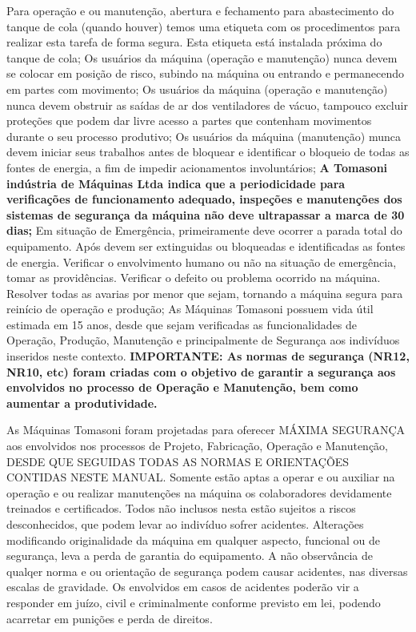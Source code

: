 Para operação e ou manutenção, abertura e fechamento para abastecimento do tanque de cola (quando houver) temos
uma etiqueta com os procedimentos para realizar esta tarefa de forma segura. Esta etiqueta está instalada próxima do
tanque de cola;
Os usuários da máquina (operação e manutenção) nunca devem se colocar em posição de risco, subindo na máquina ou
entrando e permanecendo em partes com movimento;
Os usuários da máquina (operação e manutenção) nunca devem obstruir as saídas de ar dos ventiladores de vácuo,
tampouco excluir proteções que podem dar livre acesso a partes que contenham movimentos durante o seu processo
produtivo;
Os usuários da máquina (manutenção) munca devem iniciar seus trabalhos antes de bloquear e identificar o bloqueio de
todas as fontes de energia, a fim de impedir acionamentos involuntários;
\textbf{A Tomasoni indústria de Máquinas Ltda indica que a periodicidade para verificações de funcionamento adequado,
inspeções e manutenções dos sistemas de segurança da máquina não deve ultrapassar a marca de 30 dias;}
Em situação de Emergência, primeiramente deve ocorrer a parada total do equipamento. Após devem ser extinguidas ou
bloqueadas e identificadas as fontes de energia. Verificar o envolvimento humano ou não na situação de emergência,
tomar as providências. Verificar o defeito ou problema ocorrido na máquina. Resolver todas as avarias por menor que
sejam, tornando a máquina segura para reinício de operação e produção;
As Máquinas Tomasoni possuem vida útil estimada em 15 anos, desde que sejam verificadas as funcionalidades de
Operação, Produção, Manutenção e principalmente de Segurança aos indivíduos inseridos neste contexto.
\textbf{IMPORTANTE: As normas de segurança (NR12, NR10, etc) foram criadas com o objetivo de garantir a segurança aos
envolvidos no processo de Operação e Manutenção, bem como aumentar a produtividade.
}


\newpage
\thispagestyle{fancy}
\vspace*{50 pt}

As Máquinas Tomasoni foram projetadas para oferecer MÁXIMA SEGURANÇA aos envolvidos nos processos de Projeto,
Fabricação, Operação e Manutenção, DESDE QUE SEGUIDAS TODAS AS NORMAS E ORIENTAÇÕES CONTIDAS NESTE
MANUAL.
Somente estão aptas a operar e ou auxiliar na operação e ou realizar
manutenções na máquina os colaboradores devidamente treinados e certificados.
Todos não inclusos nesta estão sujeitos a riscos desconhecidos, que podem
levar ao indivíduo sofrer acidentes.
Alterações modificando originalidade da máquina em qualquer aspecto, funcional
ou de segurança, leva a perda de garantia do equipamento.
A não observância de qualqer norma e ou orientação de segurança podem causar
acidentes, nas diversas escalas de gravidade. Os envolvidos em casos de
acidentes poderão vir a responder em juízo, civil e criminalmente conforme
previsto em lei, podendo acarretar em punições e perda de direitos.

